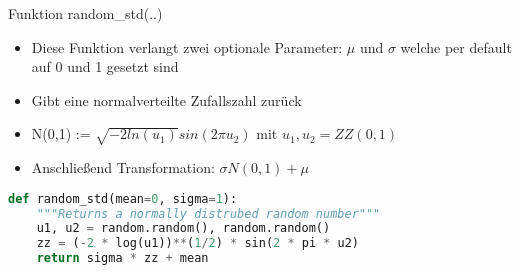  \begin{frame}[fragile]{Funktion random\_std(..)}
  \begin{itemize}
    \item Diese Funktion verlangt zwei optionale Parameter: $\mu$ und $\sigma$ welche per default auf 0 und 1 gesetzt sind
    \item Gibt eine normalverteilte Zufallszahl zurück
    \item N(0,1) := $\sqrt{-2 ln(u_1)} sin(2 \pi u_2)$ mit $u_1, u_2 = ZZ(0,1)$
    \item Anschließend Transformation: $\sigma N(0,1) + \mu$
  \end{itemize}
  \begin{lstlisting}[language=python]
def random_std(mean=0, sigma=1):
    """Returns a normally distrubed random number"""
    u1, u2 = random.random(), random.random()
    zz = (-2 * log(u1))**(1/2) * sin(2 * pi * u2)
    return sigma * zz + mean
\end{lstlisting}
\logopythonbottom
\end{frame}	